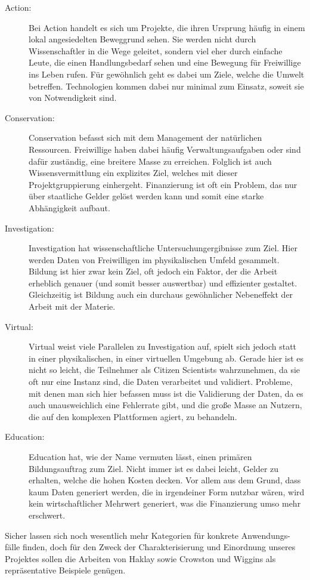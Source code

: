 \documentclass{article}
\begin{document}
\begin{description}
\item[Action:]
Bei Action handelt es sich um Projekte, die ihren Ursprung häufig in einem lokal angesiedelten Beweggrund sehen.
Sie werden nicht durch Wissenschaftler in die Wege geleitet,
sondern viel eher durch einfache Leute, die einen Handlungsbedarf sehen und eine Bewegung für Freiwillige ins Leben rufen.
Für gewöhnlich geht es dabei um Ziele, welche die Umwelt betreffen.
Technologien kommen dabei nur minimal zum Einsatz, soweit sie von Notwendigkeit sind.
\item[Conservation:]
Conservation befasst sich mit dem Management der natürlichen Ressourcen.
Freiwillige haben dabei häufig Verwaltungsaufgaben oder sind dafür zuständig, eine breitere Masse zu erreichen.
Folglich ist auch Wissensvermittlung ein explizites Ziel, welches mit dieser Projektgruppierung einhergeht.
Finanzierung ist oft ein Problem, das nur über staatliche Gelder gelöst werden kann und somit eine starke Abhängigkeit aufbaut.
\item[Investigation:]
Investigation hat wissenschaftliche Untersuchungergibnisse zum Ziel.
Hier werden Daten von Freiwilligen im physikalischen Umfeld gesammelt.
Bildung ist hier zwar kein Ziel, oft jedoch ein Faktor, der die Arbeit erheblich genauer (und somit besser auswertbar) und effizienter gestaltet.
Gleichzeitig ist Bildung auch ein durchaus gewöhnlicher Nebeneffekt der Arbeit mit der Materie.
\item[Virtual:]
Virtual weist viele Parallelen zu Investigation auf, spielt sich jedoch statt in einer physikalischen, in einer virtuellen Umgebung ab.
Gerade hier ist es nicht so leicht, die Teilnehmer als Citizen Scientists wahrzunehmen, da sie oft nur eine Instanz sind, die Daten verarbeitet und validiert.
Probleme, mit denen man sich hier befassen muss ist die Validierung der Daten, da es auch unausweichlich eine Fehlerrate gibt,
und die große Masse an Nutzern, die auf den komplexen Plattformen agiert, zu behandeln.
\item[Education:]
Education hat, wie der Name vermuten lässt, einen primären Bildungsauftrag zum Ziel.
Nicht immer ist es dabei leicht, Gelder zu erhalten, welche die hohen Kosten decken.
Vor allem aus dem Grund, dass kaum Daten generiert werden, die in irgendeiner Form nutzbar wären, wird kein wirtschaftlicher Mehrwert generiert,
was die Finanzierung umso mehr erschwert.
\end{description}
Sicher lassen sich noch wesentlich mehr Kategorien für konkrete Anwendungs-fälle finden,
doch für den Zweck der Charakterisierung und Einordnung unseres Projektes sollen die Arbeiten von Haklay sowie Crowston und Wiggins als repräsentative Beispiele genügen.
\end{document}
